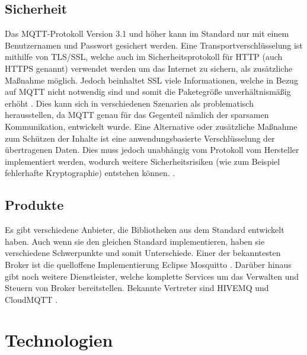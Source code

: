     \subsection{Sicherheit}
        Das \ac{MQTT}-Protokoll Version 3.1 und höher kann im Standard nur mit einem Benutzernamen und Passwort gesichert werden. Eine Transportverschlüsselung ist mithilfe von \ac{TLS}/\ac{SSL}, welche auch im Sicherheitsprotokoll für \acs{HTTP} (auch \acs{HTTPS} genannt) verwendet werden um das Internet zu sichern, als zusätzliche Maßnahme möglich. Jedoch beinhaltet SSL viele Informationen, welche in Bezug auf \ac{MQTT} nicht notwendig sind und somit die Paketegröße unverhältnismäßig erhöht \cite{mahmood_2016}.
        Dies kann sich in verschiedenen Szenarien als problematisch herausstellen, da \ac{MQTT} genau für das Gegenteil nämlich der sparsamen Kommunikation, entwickelt wurde.
        Eine Alternative oder zusätzliche Maßnahme zum Schützen der Inhalte ist eine anwendungsbasierte Verschlüsselung der übertragenen Daten. Dies muss jedoch unabhängig vom Protokoll vom Hersteller implementiert werden, wodurch weitere Sicherheitsrisiken (wie zum Beispiel fehlerhafte Kryptographie) entstehen können. \cite{mqtt_org_2019}.

    \subsection{Produkte}
        Es gibt verschiedene Anbieter, die Bibliotheken aus dem Standard entwickelt haben. Auch wenn sie den gleichen Standard implementieren, haben sie verschiedene Schwerpunkte und somit Unterschiede. Einer der bekanntesten Broker ist die quelloffene Implementierung Eclipse Mosquitto \cite{eclipse_foundation_inc_2018}. Darüber hinaus gibt noch weitere Dienstleister, welche komplette Services um das Verwalten und Steuern von Broker bereitstellen. Bekannte Vertreter sind HIVEMQ \cite{hivemq_dc_square_gmbh} und CloudMQTT \cite{84codes_ab_2019}.

\section{Technologien} \label{Technologien}

